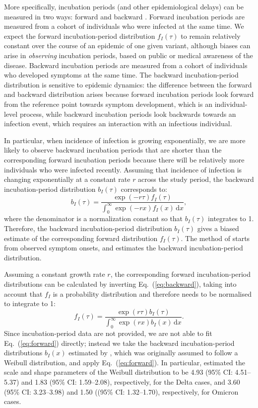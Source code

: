 \documentclass[12pt]{article}
\newcommand{\eref}[1]{Eq.~(\ref{eq:#1})}
\newcommand{\dd}[1]{\ensuremath{\, \mathrm{d}#1}}
\newcommand{\dx}{\dd{x}}
\begin{document}
More specifically, incubation periods (and other epidemiological delays) can be measured in two ways: forward and backward \citep{park2021forward}.
Forward incubation periods are measured from a cohort of individuals who were infected at the same time. 
We expect the forward incubation-period distribution $f_I(\tau)$ to remain relatively constant over the course of an epidemic of one given variant, although biases can arise in \emph{observing} incubation periods, based on public or medical awareness of the disease. 
Backward incubation periods are measured from a cohort of individuals who developed symptoms at the same time. 
The backward incubation-period distribution is sensitive to epidemic dynamics:
the difference between the forward and backward distribution arises because forward incubation periods look forward from the reference point towards symptom development, which is an individual-level process, while backward incubation periods look backwards towards an infection event, which requires an interaction with an infectious individual.

In particular, when incidence of infection is growing exponentially, we are more likely to observe backward incubation periods that are shorter than the corresponding forward incubation periods because there will be relatively more individuals who were infected recently.
Assuming that incidence of infection is changing exponentially at a constant rate $r$ across the study period, the backward incubation-period distribution $b_I(\tau)$ corresponds to:
\begin{equation}
b_I(\tau) =\frac{ \exp(-r\tau) f_I(\tau)}{\int_0^\infty \exp(-r x) f_I(x)  \dx},
\label{eq:backward}
\end{equation}
where the denominator is a normalization constant so that $b_I(\tau)$ integrates to 1.
Therefore, the backward incubation-period distribution $b_I(\tau)$ gives a biased estimate of the corresponding forward distribution $f_I(\tau)$.
The method of \cite{backer2020incubation} starts from observed symptom onsets, and estimates the backward incubation-period distribution.

Assuming a constant growth rate $r$, the corresponding forward incubation-period distributions can be calculated by inverting \eref{backward}, taking into account that $f_I$ is a probability distribution and therefore needs to be normalised to integrate to 1:
\begin{equation}
f_I(\tau) = \frac{\exp(r\tau) b_I(\tau) }{\int_0^\infty \exp(rx) b_I(x)\dx}.
\label{eq:forward}
\end{equation}
Since incubation-period data are not provided, we are not able to fit \eref{forward} directly; 
instead we take the backward incubation-period distributions $b_I(x)$ estimated by \cite{backer2021omicron}, which was originally assumed to follow a Weibull distribution, and apply \eref{forward}.
In particular, \cite{backer2021omicron} estimated the scale and shape parameters of the Weibull distribution to be 4.93 (95\% CI: 4.51--5.37) and 1.83 (95\% CI: 1.59--2.08), respectively, for the Delta cases, and 3.60 (95\% CI: 3.23--3.98) and 1.50 ((95\% CI: 1.32--1.70), respectively, for Omicron cases.
\end{document}
